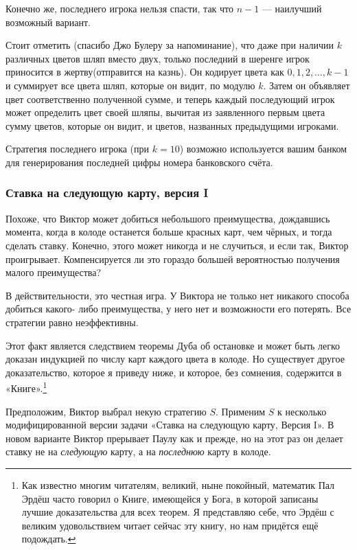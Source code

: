 Конечно же, последнего игрока нельзя спасти, так что $n-1$ --- наилучший возможный вариант.
\heart

Стоит отметить (спасибо Джо Булеру %
за напоминание), что даже при наличии $k$ различных цветов шляп вместо двух, только последний в шеренге игрок приносится в жертву(отправится на казнь).
Он кодирует цвета как $0, 1, 2, \dots, k-1$ и суммирует все цвета шляп, которые он видит, по модулю $k$.
Затем он объявляет цвет соответственно полученной сумме, и теперь каждый последующий игрок может определить цвет своей шляпы, вычитая из заявленного первым цвета сумму цветов, которые он видит, и цветов, названных предыдущими игроками.

Стратегия последнего игрока (при $k=10$) возможно используется вашим банком для генерирования последней цифры номера банковского счёта.

\subsubsection*{Ставка на следующую карту, версия I}%

Похоже, что Виктор может добиться небольшого преимущества, дождавшись момента, когда в колоде останется больше красных карт, чем чёрных, и тогда сделать ставку.
Конечно, этого может никогда и не случиться, и если так, Виктор проигрывает.
Компенсируется ли это гораздо большей вероятностью получения малого преимущества?

В действительности, это честная игра. %
У Виктора не только нет никакого способа добиться какого- либо преимущества, у него нет и возможности его потерять.
Все стратегии равно неэффективны.

Этот факт является следствием теоремы Дуба об остановке %
и может быть легко доказан индукцией по числу карт каждого цвета в колоде.
Но существует другое доказательство, которое я приведу ниже, и которое, без сомнения, содержится в «Книге».\footnote{Как известно многим читателям, великий, ныне покойный, математик Пал Эрдёш часто говорил о Книге, имеющейся у Бога, в которой записаны лучшие доказательства для всех теорем.
Я представляю себе, что Эрдёш с великим удовольствием читает сейчас эту книгу, но нам придётся ещё подождать.}

Предположим, Виктор выбрал некую стратегию $S$.
Применим $S$ к несколько модифицированной версии задачи «Ставка на следующую карту,
Версия I».
В новом варианте Виктор прерывает Паулу как и прежде, но на этот раз он делает ставку не на \emph{следующую} карту, а на \emph{последнюю} карту в колоде.

